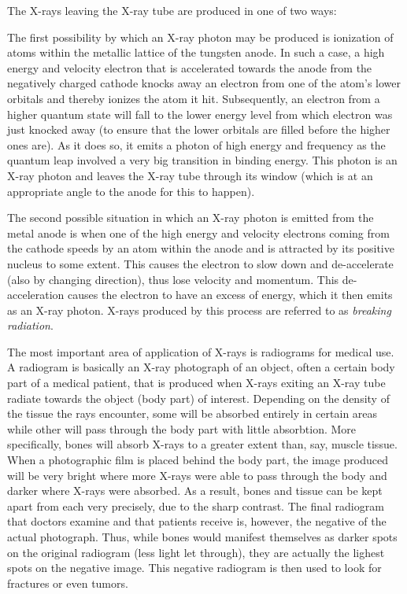 The X-rays leaving the X-ray tube are produced in one of two ways:

\begin{enumerate}


	The first possibility by which an X-ray photon may be produced is ionization of atoms within the metallic lattice of the tungsten anode. In such a case, a high energy and velocity electron that is accelerated towards the anode from the negatively charged cathode knocks away an electron from one of the atom's lower orbitals and thereby ionizes the atom it hit. Subsequently, an electron from a higher quantum state will fall to the lower energy level from which electron was just knocked away (to ensure that the lower orbitals are filled before the higher ones are). As it does so, it emits a photon of high energy and frequency as the quantum leap involved a very big transition in binding energy. This photon is an X-ray photon and leaves the X-ray tube through its window (which is at an appropriate angle to the anode for this to happen).


	The second possible situation in which an X-ray photon is emitted from the metal anode is when one of the high energy and velocity electrons coming from the cathode speeds by an atom within the anode and is attracted by its positive nucleus to some extent. This causes the electron to slow down and de-accelerate (also by changing direction), thus lose velocity and momentum. This de-acceleration causes the electron to have an excess of energy, which it then emits as an X-ray photon. X-rays produced by this process are referred to as \emph{breaking radiation}.

\end{enumerate}

\pagebreak


The most important area of application of X-rays is radiograms for medical use. A radiogram is basically an X-ray photograph of an object, often a certain body part of a medical patient, that is produced when X-rays exiting an X-ray tube radiate towards the object (body part) of interest. Depending on the density of the tissue the rays encounter, some will be absorbed entirely in certain areas while other will pass through the body part with little absorbtion. More specifically, bones will absorb X-rays to a greater extent than, say, muscle tissue. When a photographic film is placed behind the body part, the image produced will be very bright where more X-rays were able to pass through the body and darker where X-rays were absorbed. As a result, bones and tissue can be kept apart from each very precisely, due to the sharp contrast. The final radiogram that doctors examine and that patients receive is, however, the negative of the actual photograph. Thus, while bones would manifest themselves as darker spots on the original radiogram (less light let through), they are actually the lighest spots on the negative image. This negative radiogram is then used to look for fractures or even tumors.

